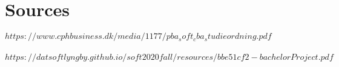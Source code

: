 \documentclass[a4paper,12pt]{article}
\begin{document}
\section{Sources}
$https://www.cphbusiness.dk/media/1177/pba_soft_cba_studieordning.pdf$
\\ \\
$https://datsoftlyngby.github.io/soft2020fall/resources/bbe51cf2-bachelorProject.pdf$



\printbibliography
\end{document}
